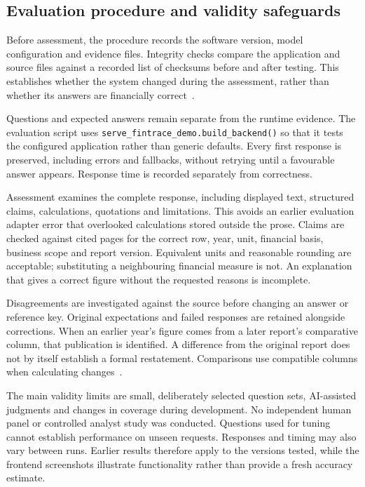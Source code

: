 \subsection{Evaluation procedure and validity safeguards}
\label{subsec:evaluation_procedure}

Before assessment, the procedure records the software version, model configuration and evidence files. Integrity checks compare the application and source files against a recorded list of checksums before and after testing. This establishes whether the system changed during the assessment, rather than whether its answers are financially correct~\cite{fintraceEval2026}.

Questions and expected answers remain separate from the runtime evidence. The evaluation script uses \texttt{serve\_fintrace\_demo.build\_backend()} so that it tests the configured application rather than generic defaults. Every first response is preserved, including errors and fallbacks, without retrying until a favourable answer appears. Response time is recorded separately from correctness.

Assessment examines the complete response, including displayed text, structured claims, calculations, quotations and limitations. This avoids an earlier evaluation adapter error that overlooked calculations stored outside the prose. Claims are checked against cited pages for the correct row, year, unit, financial basis, business scope and report version. Equivalent units and reasonable rounding are acceptable; substituting a neighbouring financial measure is not. An explanation that gives a correct figure without the requested reasons is incomplete.

Disagreements are investigated against the source before changing an answer or reference key. Original expectations and failed responses are retained alongside corrections. When an earlier year's figure comes from a later report's comparative column, that publication is identified. A difference from the original report does not by itself establish a formal restatement. Comparisons use compatible columns when calculating changes~\cite{fintraceCandidate2026}.

The main validity limits are small, deliberately selected question sets, AI-assisted judgments and changes in coverage during development. No independent human panel or controlled analyst study was conducted. Questions used for tuning cannot establish performance on unseen requests. Responses and timing may also vary between runs. Earlier results therefore apply to the versions tested, while the frontend screenshots illustrate functionality rather than provide a fresh accuracy estimate.
